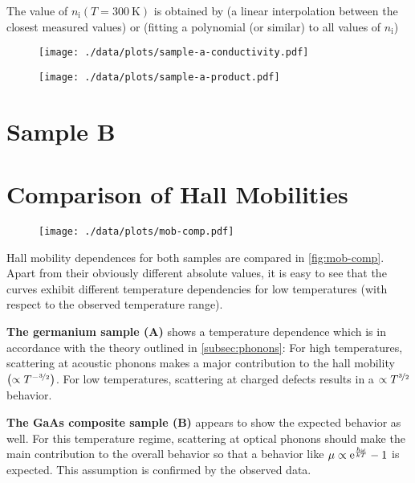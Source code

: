 The value of $n_\text{i}\left(T = \SI{300}{\kelvin}\right)$ is obtained by (a linear interpolation between the closest measured values) or (fitting a polynomial (or similar) to all values of $n_\text{i}$)


\begin{figure}
  \centering
  \texttt{[image: ./data/plots/sample-a-conductivity.pdf]}
  \label{fig:sample-a-conductivity}
\end{figure}

\begin{figure}
  \centering
  \texttt{[image: ./data/plots/sample-a-product.pdf]}
  \label{fig:sample-a-product}
\end{figure}

\section{Sample B}

\section{Comparison of Hall Mobilities}
\begin{figure}
  \centering
  \texttt{[image: ./data/plots/mob-comp.pdf]}
  \label{fig:mob-comp}
\end{figure}

Hall mobility dependences for both samples are compared in \autoref{fig:mob-comp}.
Apart from their obviously different absolute values, it is easy to see that the curves exhibit different temperature dependencies for low temperatures (with respect to the observed temperature range).

\textbf{The germanium sample (A)} shows a temperature dependence which is in accordance with the theory outlined in \autoref{subsec:phonons}: For high temperatures, scattering at acoustic phonons makes a major contribution to the hall mobility $\left(\propto T^{-\nicefrac{3}{2}}\right)$.
For low temperatures, scattering at charged defects results in a $\propto T^{\nicefrac{3}{2}}$ behavior.

\textbf{The GaAs composite sample (B)} appears to show the expected behavior as well.
For this temperature regime, scattering at optical phonons should make the main contribution to the overall behavior so that a behavior like $\mu\propto \mathrm{e}^\frac{\hbar \omega}{k T} - 1$ is expected.
This assumption is confirmed by the observed data.

% 	
